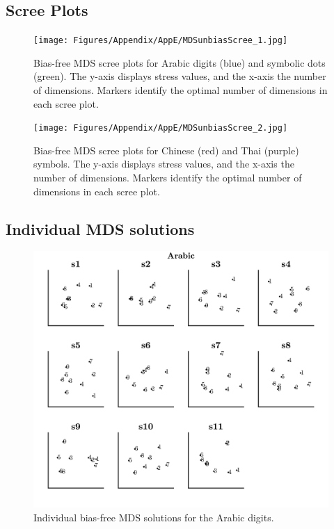 \subsection{Scree Plots} 
\begin{figure}[tbh]
\centering \texttt{[image: Figures/Appendix/AppE/MDSunbiasScree\_1.jpg]}
\caption{Bias-free MDS scree plots for Arabic digits (blue) and symbolic dots (green). The y-axis displays stress values, and the x-axis the number of dimensions. Markers identify the optimal number of dimensions in each scree plot.}
\label{fig:Apx_ScreeEngDot_Cross}
\end{figure}

\begin{figure}[tbh]
\centering \texttt{[image: Figures/Appendix/AppE/MDSunbiasScree\_2.jpg]}
\caption{Bias-free MDS scree plots for Chinese (red) and Thai (purple) symbols. The y-axis displays stress values, and the x-axis the number of dimensions. Markers identify the optimal number of dimensions in each scree plot.}
\label{fig:Apx_ScreeChnThi_Cross}
\end{figure}

\clearpage
\subsection{Individual MDS solutions} 

\begin{figure}[tbh]
\centering \includegraphics[scale = .67]{Figures/Appendix/AppE/BiasFree_Indiv_MDS_1.jpg}
\caption{Individual bias-free MDS solutions for the Arabic digits.}
\label{fig:Apx_MDSenglish_Cross}
\end{figure}

